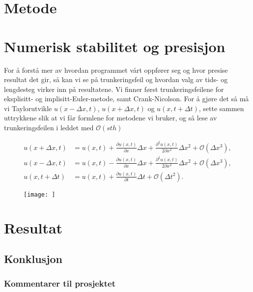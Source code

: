 \documentclass[norsk, 10pt]{article}
\begin{document}

\section*{Metode}

\section*{Numerisk stabilitet og presisjon}
For å forstå mer av hvordan programmet vårt oppfører seg og hvor presise resultat det gir, så kan vi se på trunkeringsfeil og hvordan valg av tids- og lengdesteg virker inn på resultatene. Vi finner først trunkeringsfeilene for eksplisitt- og implisitt-Euler-metode, samt Crank-Nicolson. For å gjøre det så må vi Taylorutvikle $u(x-\Delta x, t)$, $u(x+\Delta x, t)$ og $u(x, t+\Delta t)$, sette sammen uttrykkene slik at vi får formlene for metodene vi bruker, og så lese av trunkeringsfeilen i leddet med $\mathcal O(sth)$

\begin{align}
u(x+\Delta x,t)&=u(x,t)+\frac{\partial u(x,t)}{\partial x} \Delta x+\frac{\partial^2 u(x,t)}{2\partial x^2}\Delta x^2+\mathcal{O}(\Delta x^3),
\label{_auto1}\\ \nonumber
u(x-\Delta x,t)&=u(x,t)-\frac{\partial u(x,t)}{\partial x}\Delta x+\frac{\partial^2 u(x,t)}{2\partial x^2} \Delta x^2+\mathcal{O}(\Delta x^3),\\ \nonumber
u(x,t+\Delta t)&=u(x,t)+\frac{\partial u(x,t)}{\partial t}\Delta t+  \mathcal{O}(\Delta t^2).
\label{eq:deltat0}
\end{align}



\begin{figure}[H]
\centering
\texttt{[image: ]}
\caption{}
\label{fig:}
\end{figure}


\section*{Resultat}


\subsection*{Konklusjon}

\subsubsection*{Kommentarer til prosjektet}
\end{document}
